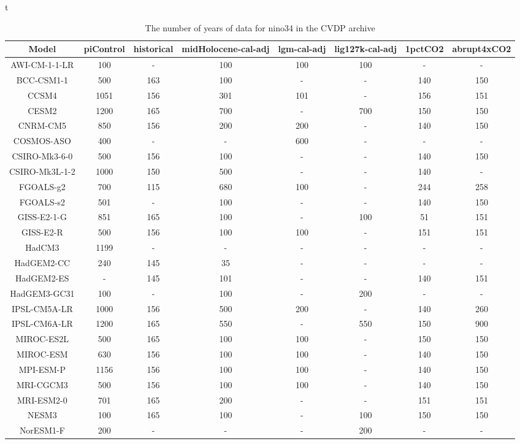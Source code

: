 \begin{table}{t}
\begin{tabular}{ c |  c | c | c | c | c | c | c  } 
\hline
Model&piControl&historical&midHolocene-cal-adj&lgm-cal-adj&lig127k-cal-adj&1pctCO2&abrupt4xCO2\\ \hline
AWI-CM-1-1-LR&100&-&100&100&100&-&-\\
BCC-CSM1-1&500&163&100&-&-&140&150\\
CCSM4&1051&156&301&101&-&156&151\\
CESM2&1200&165&700&-&700&150&150\\
CNRM-CM5&850&156&200&200&-&140&150\\
COSMOS-ASO&400&-&-&600&-&-&-\\
CSIRO-Mk3-6-0&500&156&100&-&-&140&150\\
CSIRO-Mk3L-1-2&1000&150&500&-&-&140&-\\
FGOALS-g2&700&115&680&100&-&244&258\\
FGOALS-s2&501&-&100&-&-&140&150\\
GISS-E2-1-G&851&165&100&-&100&51&151\\
GISS-E2-R&500&156&100&100&-&151&151\\
HadCM3&1199&-&-&-&-&-&-\\
HadGEM2-CC&240&145&35&-&-&-&-\\
HadGEM2-ES&-&145&101&-&-&140&151\\
HadGEM3-GC31&100&-&100&-&200&-&-\\
IPSL-CM5A-LR&1000&156&500&200&-&140&260\\
IPSL-CM6A-LR&1200&165&550&-&550&150&900\\
MIROC-ES2L&500&165&100&100&-&150&150\\
MIROC-ESM&630&156&100&100&-&140&150\\
MPI-ESM-P&1156&156&100&100&-&140&150\\
MRI-CGCM3&500&156&100&100&-&140&150\\
MRI-ESM2-0&701&165&200&-&-&151&151\\
NESM3&100&165&100&-&100&150&150\\
NorESM1-F&200&-&-&-&200&-&-\\
\hline
\end{tabular}
\caption{The number of years of data for nino34 in the CVDP archive}
\label{tab:model}
\end{table}
